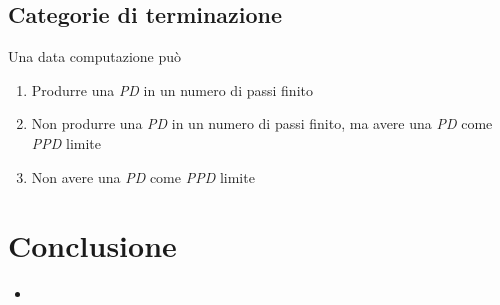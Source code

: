 \documentclass{beamer}
\begin{document}
\subsection{Categorie di terminazione}

\begin{frame}{\subsecname}{}
	Una data computazione può
	\begin{enumerate}
		\item<+-> Produrre una \textit{PD} in un numero di passi finito
		\item<+-> Non produrre una \textit{PD} in un numero di passi finito, ma avere una \textit{PD} come \textit{PPD} limite
		\item<+-> Non avere una \textit{PD} come \textit{PPD} limite
	\end{enumerate}
\end{frame}

\section{Conclusione}

\begin{frame}{\secname}{}
	\begin{itemize}
		\item
	\end{itemize}
\end{frame}
\end{document}
